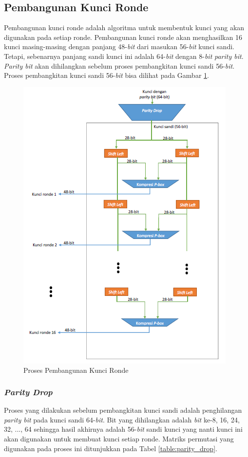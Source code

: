 \subsection{Pembangunan Kunci Ronde}
Pembangunan kunci ronde adalah algoritma untuk membentuk kunci yang akan digunakan pada setiap ronde. Pembangunan kunci ronde akan menghasilkan 16 kunci masing-masing dengan panjang 48-\textit{bit} dari masukan 56-\textit{bit} kunci sandi. Tetapi, sebenarnya panjang sandi kunci ini adalah 64-\textit{bit} dengan 8-\textit{bit} \textit{parity bit}. \textit{Parity bit} akan dihilangkan sebelum proses pembangkitan kunci sandi 56-\textit{bit}. Proses pembangkitan kunci sandi 56-\textit{bit} bisa dilihat pada Gambar \ref{fig:kuncironde}.

\begin{figure}[H]
	\includegraphics[scale=0.8]{Gambar/key_generation2}
	\centering
	\caption{Proses Pembangunan Kunci Ronde}\label{fig:kuncironde}
\end{figure}

\subsubsection{\textit{Parity Drop}}
Proses yang dilakukan sebelum pembangkitan kunci sandi adalah penghilangan \textit{parity bit} pada kunci sandi 64-\textit{bit}. Bit yang dihilangkan adalah \textit{bit} ke-8, 16, 24, 32, ..., 64 sehingga hasil akhirnya adalah 56-\textit{bit} sandi kunci yang nanti kunci ini akan digunakan untuk membuat kunci setiap ronde. Matriks permutasi yang digunakan pada proses ini ditunjukkan pada Tabel \ref{table:parity_drop}.


